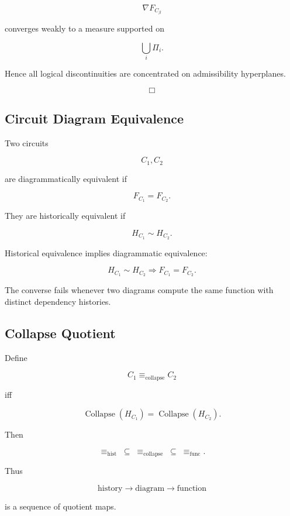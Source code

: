 \documentclass[12pt,oneside]{article}
\theoremstyle{definition}
\theoremstyle{remark}
\begin{document}
\[
\nabla F_{C_\beta}
\]

converges weakly to a measure supported on

\[
\bigcup_i\Pi_i.
\]

Hence all logical discontinuities are concentrated on admissibility
hyperplanes.

\[
\Box
\]

\subsection*{Circuit Diagram Equivalence}

Two circuits

\[
C_1,C_2
\]

are diagrammatically equivalent if

\[
F_{C_1}=F_{C_2}.
\]

They are historically equivalent if

\[
H_{C_1}\sim H_{C_2}.
\]

Historical equivalence implies diagrammatic equivalence:

\[
H_{C_1}\sim H_{C_2}
\Longrightarrow
F_{C_1}=F_{C_2}.
\]

The converse fails whenever two diagrams compute the same function with
distinct dependency histories.

\subsection*{Collapse Quotient}

Define

\[
C_1\equiv_{\mathrm{collapse}} C_2
\]

iff

\[
\operatorname{Collapse}(H_{C_1})
=
\operatorname{Collapse}(H_{C_2}).
\]

Then

\[
\equiv_{\mathrm{hist}}
\;\subseteq\;
\equiv_{\mathrm{collapse}}
\;\subseteq\;
\equiv_{\mathrm{func}}.
\]

Thus

\[
\text{history}
\rightarrow
\text{diagram}
\rightarrow
\text{function}
\]

is a sequence of quotient maps.

\end{document}
